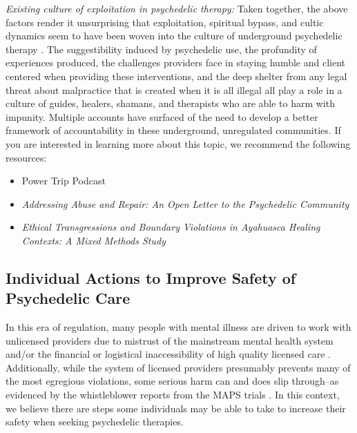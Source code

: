 \documentclass[12pt,letterpaper]{book}
\begin{document}
\textit{Existing culture of exploitation in psychedelic therapy:}
Taken together, the above factors render it unsurprising that exploitation, spiritual bypass, and cultic dynamics seem to have been woven into the culture of underground psychedelic therapy \cite{powerTrip,abuseLetter,brown2020ethical}. The suggestibility induced by psychedelic use, the profundity of experiences produced, the challenges providers face in staying humble and client centered when providing these interventions, and the deep shelter from any legal threat about malpractice that is created when it is all illegal all play a role in a culture of guides, healers, shamans, and therapists who are able to harm with impunity. Multiple accounts have surfaced of the need to develop a better framework of accountability in these underground, unregulated communities.
If you are interested in learning more about this topic, we recommend the following resources:
\begin{itemize}
    \item Power Trip Podcast \cite{powerTrip}
    \item \textit{Addressing Abuse and Repair: An Open Letter to the Psychedelic Community} \cite{abuseLetter}
    \item \textit{Ethical Transgressions and Boundary Violations in Ayahuasca Healing Contexts: A Mixed Methods Study} \cite{brown2020ethical}
\end{itemize}

\subsection*{Individual Actions to Improve Safety of Psychedelic Care}
In this era of regulation, many people with mental illness are driven to work with unlicensed providers due to mistrust of the mainstream mental health system and/or the financial or logistical inaccessibility of high quality licensed care \cite{aboujaoude2020coachingVSTherapy}. Additionally, while the system of licensed providers presumably prevents many of the most egregious violations, some serious harm can and does slip through–as evidenced by the whistleblower reports from the MAPS trials \cite{devenotCommittee}. In this context, we believe there are steps some individuals may be able to take to increase their safety when seeking psychedelic therapies.
\end{document}
